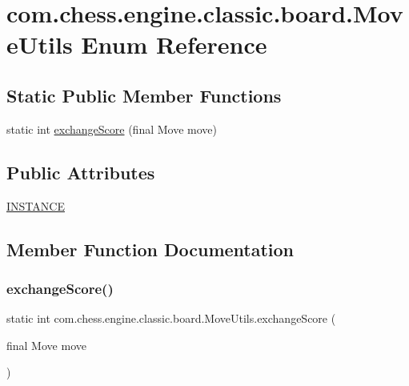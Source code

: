 \hypertarget{enumcom_1_1chess_1_1engine_1_1classic_1_1board_1_1_move_utils}{}\section{com.\+chess.\+engine.\+classic.\+board.\+Move\+Utils Enum Reference}
\label{enumcom_1_1chess_1_1engine_1_1classic_1_1board_1_1_move_utils}
\subsection*{Static Public Member Functions}
\begin{DoxyCompactItemize}
\item 
static int \mbox{\hyperlink{enumcom_1_1chess_1_1engine_1_1classic_1_1board_1_1_move_utils_acd544650a7b26958446c41e3f2487df7}{exchange\+Score}} (final Move move)
\end{DoxyCompactItemize}
\subsection*{Public Attributes}
\begin{DoxyCompactItemize}
\item 
\mbox{\hyperlink{enumcom_1_1chess_1_1engine_1_1classic_1_1board_1_1_move_utils_af8aad7f4a2fa99e792337918fcfb8c2c}{I\+N\+S\+T\+A\+N\+CE}}
\end{DoxyCompactItemize}


\subsection{Member Function Documentation}
\mbox{\label{enumcom_1_1chess_1_1engine_1_1classic_1_1board_1_1_move_utils_acd544650a7b26958446c41e3f2487df7}} 
\subsubsection{\texorpdfstring{exchangeScore()}{exchangeScore()}}
{\footnotesize\ttfamily static int com.\+chess.\+engine.\+classic.\+board.\+Move\+Utils.\+exchange\+Score (\begin{DoxyParamCaption}\item[{final Move}]{move }\end{DoxyParamCaption})\hspace{0.3cm}{\ttfamily [static]}}



